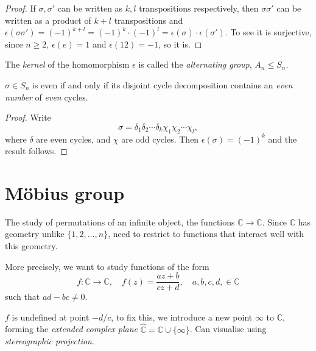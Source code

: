 \documentclass[10pt]{article}
\def\le{\leqslant}
\def\ge{\geqslant}
\begin{document}
    \begin{proof}
        If $ \sigma,\sigma' $ can be written as $k,l$ transpositions respectively, then $ \sigma \sigma' $ can be written as a product of $k+l$ transpositions and $ \epsilon(\sigma \sigma')=(-1)^{k+l}=(-1)^k\cdot (-1)^l=\epsilon(\sigma)\cdot \epsilon(\sigma') $. To see it is surjective, since $n\ge 2$, $ \epsilon(e)=1 $ and $ \epsilon(12)=-1 $, so it is.
    \end{proof}
    \begin{definition}
        The \textit{kernel} of the homomorphism $ \epsilon $ is called the \textit{alternating group}, $ A_n \le S_n$.
    \end{definition}
    \begin{proposition}\label{prop:2.21}
        $ \sigma\in S_n $ is even if and only if its disjoint cycle decomposition contains an \textit{even number} of \textit{even} cycles.
    \end{proposition}
    \begin{proof}
        Write 
        \[
            \sigma = \delta_1 \delta_2 \cdots \delta_k \chi_1 \chi_2\cdots \chi_{l}
        ,\]
        where $\delta$ are even cycles, and $\chi$ are odd cycles. Then $ \epsilon(\sigma)=(-1)^{k} $ and the result follows.
    \end{proof}
    \section{M\"{o}bius group}
    The study of permutations of an infinite object, the functions $ \mathbb{C} \to \mathbb{C} $. Since $\mathbb{C}$ has geometry unlike $ \{1,2,\dots,n\} $, need to restrict to functions that interact well with this geometry.

    More precisely, we want to study functions of the form 
    \[
        f:\mathbb{C} \to \mathbb{C}, \quad f(z)=\frac{az+b}{cz+d},\quad a,b,c,d,\in \mathbb{C} 
    \]
    such that $ad-bc\neq 0$.

    $f$ is undefined at point $-d/c$, to fix this, we introduce a new point $ \infty $ to $ \mathbb{C} $, forming the \textit{extended complex plane} $ \hat{\mathbb{C}}=\mathbb{C} \cup \{\infty\} $. Can visualise using \textit{stereographic projection}.
\end{document}

